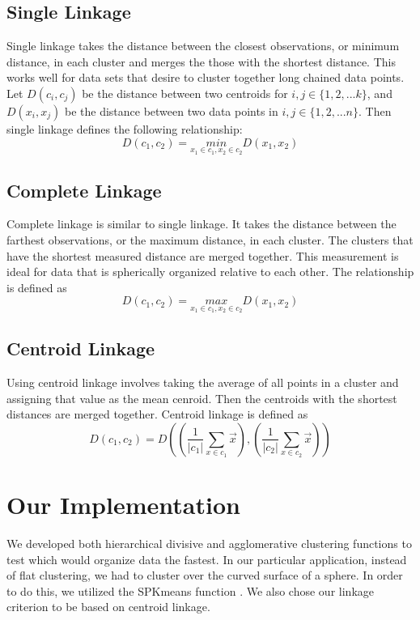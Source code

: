 \documentclass[../tech_report_1.tex]{subfiles}
\begin{document}
\subsection*{Single Linkage}

Single linkage takes the distance between the closest observations,
or minimum distance, in each cluster and merges the those with the
shortest distance. This works well for data sets that desire to cluster
together long chained data points. Let $D(c_i,c_j)$ be the distance between two centroids for $i,j \in \{1, 2, ... k\}$, and $D(x_i, x_j)$ be the distance between two data points in $i, j \in \{ 1, 2, ... n \}$. Then single linkage defines the following relationship:
\[
D(c_{1},c_{2})=\underset{x_{1}\in c_{1},x_{2}\in c_{2}}{min}D(x_{1},x_{2})
\]



\subsection*{Complete Linkage}

Complete linkage is similar to single linkage. It takes the distance
between the farthest observations, or the maximum distance, in each
cluster. The clusters that have the shortest measured distance are
merged together. This measurement is ideal for data that is spherically
organized relative to each other. The relationship is defined as
\[
D(c_{1},c_{2})=\underset{x_{1}\in c_{1},x_{2}\in c_{2}}{max}D(x_{1},x_{2})
\]



\subsection*{Centroid Linkage}

Using centroid linkage involves taking the average of all points in
a cluster and assigning that value as the mean cenroid. Then
the centroids with the shortest distances are merged together.
Centroid linkage is defined as
\[
D(c_{1},c_{2})=D((\frac{1}{|c_{1}|}\sum_{x\in c_{1}}\overset{\rightarrow}{x}),(\frac{1}{|c_{2}|}\sum_{x\in c_{2}}\overset{\rightarrow}{x}))
\]



\section*{Our Implementation}

We developed both hierarchical divisive and agglomerative clustering
functions to test which would organize data the fastest. In our particular
application, instead of flat clustering, we had to cluster over the
curved surface of a sphere. In order to do this, we utilized the SPKmeans
function \cite{nguyen_spherical_clustering}. We also chose our linkage criterion
to be based on centroid linkage.
\end{document}
